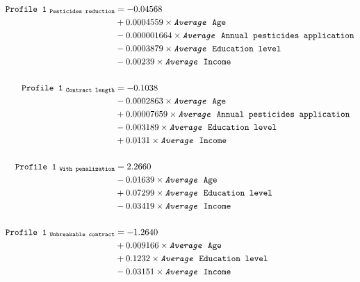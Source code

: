 \documentclass[12pt]{article}
\begin{document}
\begin{align*}
 \texttt{Profile 1}_{~\texttt{Pesticides reduction}}
 &= -0.04568\\
 &+ 0.0004559 \times \texttt{\textit{Average} Age}\\
 &- 0.000001664 \times \texttt{\textit{Average} Annual pesticides application}\\
 &- 0.0003879 \times \texttt{\textit{Average} Education level}\\
 &- 0.00239 \times \texttt{\textit{Average} Income}\\
 \\
 \texttt{Profile 1}_{~\texttt{Contract length}}
 &= -0.1038\\
 &- 0.0002863 \times \texttt{\textit{Average} Age}\\
 &+ 0.00007659 \times \texttt{\textit{Average} Annual pesticides application}\\
 &- 0.003189 \times \texttt{\textit{Average} Education level}\\
 &+ 0.0131 \times \texttt{\textit{Average} Income}\\
 \\
 \texttt{Profile 1}_{~\texttt{With penalization}}
 &= 2.2660\\
 &- 0.01639 \times \texttt{\textit{Average} Age}\\
 &+ 0.07299 \times \texttt{\textit{Average} Education level}\\
 &- 0.03419 \times \texttt{\textit{Average} Income}\\
 \\
 \texttt{Profile 1}_{~\texttt{Unbreakable contract}}
 &= -1.2640\\
 &+ 0.009166 \times \texttt{\textit{Average} Age}\\
 &+ 0.1232 \times \texttt{\textit{Average} Education level}\\
 &- 0.03151 \times \texttt{\textit{Average} Income}
\end{align*}
\end{document}
